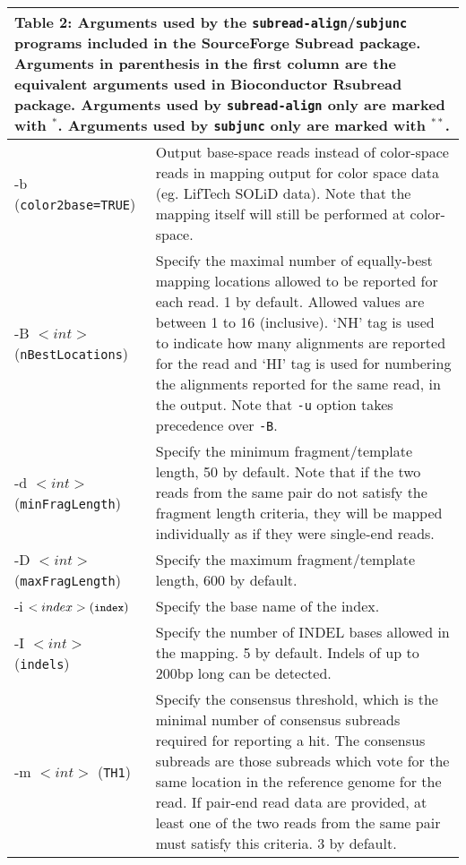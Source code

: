 \documentclass[12pt]{report}
\newcommand{\code}[1]{{\small\texttt{#1}}}
\newcommand{\Subread}{\textsf{Subread}}
\newcommand{\Rsubread}{\textsf{Rsubread}}
\begin{document}
\begin{longtable}{|p{4cm}|p{12cm}|}
\multicolumn{2}{p{16cm}}{Table 2: Arguments used by the \code{subread-align}/\code{subjunc} programs included in the SourceForge {\Subread} package.
Arguments in parenthesis in the first column are the equivalent arguments used in Bioconductor {\Rsubread} package.
Arguments used by \code{subread-align} only are marked with $^*$.
Arguments used by \code{subjunc} only are marked with $^{**}$.
\newline
}
\endfirsthead
\hline
Arguments & Description \\
\hline
-b \newline (\code{color2base=TRUE}) & Output base-space reads instead of color-space reads in mapping output for color space data (eg. LifTech SOLiD data). Note that the mapping itself will still be performed at color-space.\\
\hline
-B $<int>$ \newline (\code{nBestLocations}) & Specify the maximal number of equally-best mapping locations allowed to be reported for each read. 1 by default. Allowed values are between 1 to 16 (inclusive). `NH' tag is used to indicate how many alignments are reported for the read and `HI' tag is used for numbering the alignments reported for the same read, in the output. Note that \code{-u} option takes precedence over \code{-B}.\\
\hline
-d $<int>$ \newline (\code{minFragLength}) & Specify the minimum fragment/template length, 50 by default.  Note that if the two reads from the same pair do not satisfy the fragment length criteria, they will be mapped individually as if they were single-end reads.\\
\hline
-D $<int>$ \newline (\code{maxFragLength}) & Specify the maximum fragment/template length, 600 by default.\\
\hline
-i $<index> \newline (\code{index}) $ & Specify the base name of the index.\\
\hline
-I $<int>$ \newline (\code{indels}) & Specify the number of INDEL bases allowed in the mapping. 5 by default. Indels of up to 200bp long can be detected.\\
\hline
-m  $<int>$ \newline (\code{TH1}) & Specify the consensus threshold, which is the minimal number of consensus subreads required for reporting a hit. The consensus subreads are those subreads which vote for the same location in the reference genome for the read. If pair-end read data are provided, at least one of the two reads from the same pair must satisfy this criteria. 3 by default.\\

\end{longtable}
\end{document}
